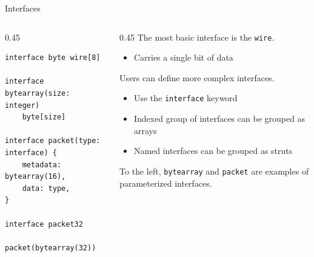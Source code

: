 \begin{frame}[fragile]{Interfaces}
    \begin{columns}[T]
        \begin{column}{0.45\textwidth}
\begin{lstlisting}[language=gapl]
interface byte wire[8]

interface bytearray(size: integer)
    byte[size]

interface packet(type: interface) {
    metadata: bytearray(16),
    data: type,
}

interface packet32
    packet(bytearray(32))
\end{lstlisting}
        \end{column}
        \begin{column}{0.45\textwidth}
            The most basic interface is the \lstinline|wire|.
            \begin{itemize}
                \item Carries a single bit of data
            \end{itemize}
            Users can define more complex interfaces.
            \begin{itemize}
                \item Use the \lstinline|interface| keyword
                \item Indexed group of interfaces can be grouped as arrays
                \item Named interfaces can be grouped as struts
            \end{itemize}
            To the left, \lstinline|bytearray| and \lstinline|packet| are examples of parameterized interfaces.
        \end{column}
    \end{columns}
\end{frame}

